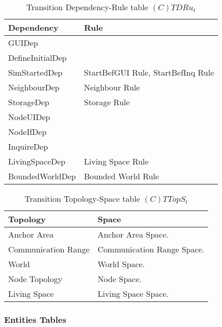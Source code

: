 \begin{table}[H]
	\centering
	\begin{tabular}{|p{4cm}|p{8cm}|}
			\hline
			\textbf{Dependency} & \textbf{Rule} \\
			\hline
			GUIDep & \\
			\hline
			DefineInitialDep & \\
			\hline
			SimStartedDep & StartBefGUI Rule, StartBefInq Rule\\
			\hline
			NeighbourDep & Neighbour Rule\\
			\hline
			StorageDep & Storage Rule \\
			\hline
			NodeUIDep & \\
			\hline
			NodeIfDep & \\
			\hline
			InquireDep & \\
			\hline
			LivingSpaceDep & Living Space Rule\\
			\hline
			BoundedWorldDep & Bounded World Rule\\
			\hline
		\end{tabular}
	\caption{Transition Dependency-Rule table $(C)TDRu_t$}
	\label{tab:ctdrut}
\end{table}

\begin{table}[H]
	\centering
	\begin{tabular}{|p{4cm}|p{8cm}|}
			\hline
			\textbf{Topology} & \textbf{Space} \\
			\hline
			Anchor Area & Anchor Area Space.\\
			\hline
			Communication Range & Communication Range Space. \\
			\hline
			World & World Space. \\
			\hline
			Node Topology & Node Space. \\
			\hline
			Living Space & Living Space Space. \\
			\hline
		\end{tabular}
	\caption{Transition Topology-Space table $(C)TTopS_t$}
	\label{tab:cttopst}
\end{table}

\subsubsection{Entities Tables}

